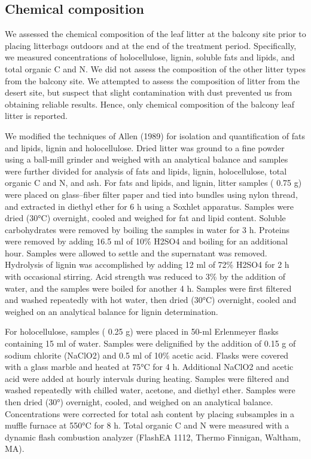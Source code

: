 \documentclass[
]{article}
\begin{document}
\subsection{Chemical composition}\label{chemical-composition}

We assessed the chemical composition of the leaf litter at the balcony
site prior to placing litterbags outdoors and at the end of the
treatment period. Specifically, we measured concentrations of
holocellulose, lignin, soluble fats and lipids, and total organic C and
N. We did not assess the composition of the other litter types from the
balcony site. We attempted to assess the composition of litter from the
desert site, but suspect that slight contamination with dust prevented
us from obtaining reliable results. Hence, only chemical composition of
the balcony leaf litter is reported.

We modified the techniques of Allen (1989) for isolation and
quantification of fats and lipids, lignin and holocellulose. Dried
litter was ground to a fine powder using a ball-mill grinder and weighed
with an analytical balance and samples were further divided for analysis
of fats and lipids, lignin, holocellulose, total organic C and N, and
ash. For fats and lipids, and lignin, litter samples ( 0.75 g) were
placed on glass--fiber filter paper and tied into bundles using nylon
thread, and extracted in diethyl ether for 6 h using a Soxhlet
apparatus. Samples were dried (30°C) overnight, cooled and weighed for
fat and lipid content. Soluble carbohydrates were removed by boiling the
samples in water for 3 h. Proteins were removed by adding 16.5 ml of
10\% H2SO4 and boiling for an additional hour. Samples were allowed to
settle and the supernatant was removed. Hydrolysis of lignin was
accomplished by adding 12 ml of 72\% H2SO4 for 2 h with occasional
stirring. Acid strength was reduced to 3\% by the addition of water, and
the samples were boiled for another 4 h. Samples were first filtered and
washed repeatedly with hot water, then dried (30°C) overnight, cooled
and weighed on an analytical balance for lignin determination.

For holocellulose, samples ( 0.25 g) were placed in 50-ml Erlenmeyer
flasks containing 15 ml of water. Samples were delignified by the
addition of 0.15 g of sodium chlorite (NaClO2) and 0.5 ml of 10\% acetic
acid. Flasks were covered with a glass marble and heated at 75°C for 4
h. Additional NaClO2 and acetic acid were added at hourly intervals
during heating. Samples were filtered and washed repeatedly with chilled
water, acetone, and diethyl ether. Samples were then dried (30°)
overnight, cooled, and weighed on an analytical balance. Concentrations
were corrected for total ash content by placing subsamples in a muffle
furnace at 550°C for 8 h. Total organic C and N were measured with a
dynamic flash combustion analyzer (FlashEA 1112, Thermo Finnigan,
Waltham, MA).
\end{document}

